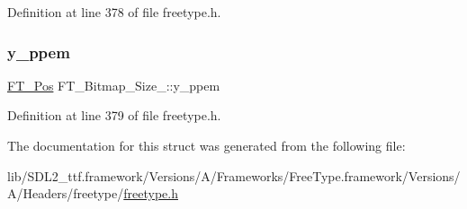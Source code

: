 Definition at line 378 of file freetype.\+h.

\mbox{\label{struct_f_t___bitmap___size___a60d4d003d09fd57505f69f39e31e19c1}} 
\subsubsection{\texorpdfstring{y\_ppem}{y\_ppem}}
{\footnotesize\ttfamily \mbox{\hyperlink{ftimage_8h_af5f230f4b253d4c7715fd2e595614c90}{F\+T\+\_\+\+Pos}} F\+T\+\_\+\+Bitmap\+\_\+\+Size\+\_\+\+::y\+\_\+ppem}



Definition at line 379 of file freetype.\+h.



The documentation for this struct was generated from the following file\+:\begin{DoxyCompactItemize}
\item 
lib/\+S\+D\+L2\+\_\+ttf.\+framework/\+Versions/\+A/\+Frameworks/\+Free\+Type.\+framework/\+Versions/\+A/\+Headers/freetype/\mbox{\hyperlink{freetype_8h}{freetype.\+h}}\end{DoxyCompactItemize}
